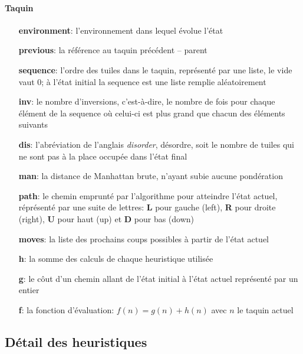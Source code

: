 \documentclass[10pt,a4paper]{report}
\begin{document}
\paragraph{Taquin}
\begin{enumerate}
	\item [{\ttfamily\bfseries environment}:] {l'environnement dans lequel évolue l’état}
	\item [{\ttfamily\bfseries previous}:] {la référence au taquin précédent – parent}
	\item [{\ttfamily\bfseries sequence}:] {l'ordre des tuiles dans le taquin, représenté par une liste, le vide vaut ${0}$; à l'état initial la {\ttfamily sequence} est une liste remplie aléatoirement}
	\item [{\ttfamily\bfseries inv}:] {le nombre d'inversions,  c’est-à-dire, le nombre de fois pour chaque élément de la {\ttfamily sequence}  où celui-ci est plus grand que chacun des éléments suivants}
	\item [{\ttfamily\bfseries dis}:] {l'abréviation de l'anglais {\em disorder}, désordre, soit le nombre de tuiles qui ne sont pas à la place occupée dans l'état final}
	\item [{\ttfamily\bfseries man}:] {la distance de Manhattan brute, n'ayant subie aucune pondération}
	\item [{\ttfamily\bfseries path}:] {le chemin emprunté par l'algorithme pour atteindre l'état actuel, réprésenté par une suite de lettres: {\ttfamily\bfseries L} pour gauche (left), {\ttfamily\bfseries R} pour droite (right), {\ttfamily\bfseries U} pour haut (up) et {\ttfamily\bfseries D} pour bas (down)}
	\item [{\ttfamily\bfseries moves}:] {la liste des prochains coups possibles à partir de l'état actuel}
	\item [{\ttfamily\bfseries h}:] {la somme des calculs de chaque heuristique utilisée}
	\item [{\ttfamily\bfseries g}:] {le côut d'un chemin allant de l'état initial à l'état actuel représenté par un entier}
	\item [{\ttfamily\bfseries f}:] {la fonction d'évaluation: ${f(n) = g(n) + h(n)}$ avec ${n}$ le taquin actuel}
\end{enumerate}

\subsection{Détail des heuristiques}
\end{document}
